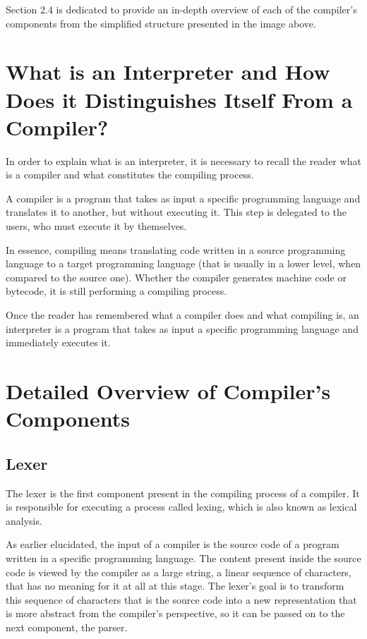 Section 2.4 is dedicated to provide an in-depth overview of each of the compiler's components from the simplified structure presented in the image above.


\section{What is an Interpreter and How Does it Distinguishes Itself From a Compiler?}
In order to explain what is an interpreter, it is necessary to recall the reader what is a compiler and what constitutes the compiling process.

A compiler is a program that takes as input a specific programming language and translates it to another, but without executing it. This step is delegated to the users, who must execute it by themselves.

In essence, compiling means translating code written in a source programming language to a target programming language (that is usually in a lower level, when compared to the source one). Whether the compiler generates machine code or bytecode, it is still performing a compiling process.

Once the reader has remembered what a compiler does and what compiling is, an interpreter is a program that takes as input a specific programming language and immediately executes it.


\section{Detailed Overview of Compiler's Components}

\subsection{Lexer}
The lexer is the first component present in the compiling process of a compiler. It is responsible for executing a process called lexing, which is also known as lexical analysis.

As earlier elucidated, the input of a compiler is the source code of a program written in a specific programming language. The content present inside the source code is viewed by the compiler as a large string, a linear sequence of characters, that has no meaning for it at all at this stage. The lexer's goal is to transform this sequence of characters that is the source code into a new representation that is more abstract from the compiler's perspective, so it can be passed on to the next component, the parser.

